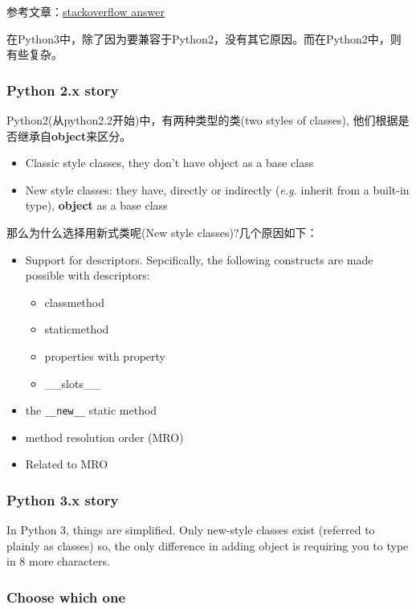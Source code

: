 参考文章：\href{https://stackoverflow.com/questions/4015417/python-class-inherits-object}{stackoverflow answer}

在Python3中，除了因为要兼容于Python2，没有其它原因。而在Python2中，则有些复杂。

\subsubsection{Python 2.x story}
Python2(从python2.2开始)中，有两种类型的类(two styles of classes), 他们根据是否继承自\textbf{object}来区分。

\begin{itemize}
\item Classic style classes, they don't have object as a base class
\item New style classes: they have, directly or indirectly (\textit{e.g.} inherit from a built-in type), \textbf{object} as a base class
\end{itemize}

那么为什么选择用新式类呢(New style classes)?几个原因如下：
\begin{itemize}
\item Support for descriptors. Sepcifically, the following constructs are made possible with descriptors:
\begin{itemize}
\item classmethod
\item staticmethod
\item properties with property
\item \_\_slots\_\_
\end{itemize}
\item the \verb|__new__| static method
\item method resolution order (MRO)
\item Related to MRO
\end{itemize}

\subsubsection{Python 3.x story}

In Python 3, things are simplified. Only new-style classes exist (referred to plainly as classes) so, the only difference in adding object is requiring you to type in 8 more characters. 


\subsubsection{Choose which one}

